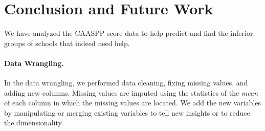 \documentclass[11pt]{article}
\begin{document}
%
%
%
%

\section{Conclusion and Future Work}

We have analyzed the CAASPP score data 
to help predict and find the inferior groups of schools that indeed need help.

\paragraph*{Data Wrangling.} In the data wrangling,
we performed data cleaning, fixing missing values, and adding new columns.
%
Missing values are imputed using the statistics of the \textit{mean} of each column in which the missing values are located.
%
We add the new variables by manipulating or merging existing variables to tell new insights or to reduce the dimensionality.
\end{document}

